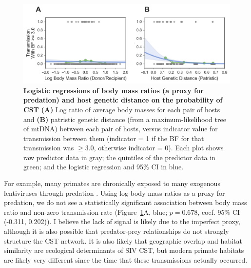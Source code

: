 \begin{figure}[ht!]
  \begin{centering}
    \includegraphics[width=.8\linewidth]{./png/siv_predict.png}
  	\caption[Logistic regressions of predictors on the probability of CST]{\textbf{Logistic regressions of body mass ratios (a proxy for predation) and host genetic distance on the probability of CST }
\textbf{(A)} Log ratio of average body masses for each pair of hosts and \textbf{(B)} patristic genetic distance (from a maximum-likelihood tree of mtDNA) between each pair of hosts, versus indicator value for transmission between them (indicator = 1 if the BF for that transmission was $\geq 3.0$, otherwise indicator = 0).
Each plot shows raw predictor data in gray; the quintiles of the predictor data in green; and the logistic regression and 95\% CI in blue.
    }
  	\label{siv_predict}
  \end{centering}
\end{figure}

For example, many primates are chronically exposed to many exogenous lentiviruses through predation \citep{aghokeng2010extensive,goodall1986chimpanzees,sharp2011origins}.
Using log body mass ratios \citep{iucn2008international} as a proxy for predation, we do not see a statistically significant association between body mass ratio and non-zero transmission rate (Figure~\ref{siv_predict}A, blue; $p=0.678$, coef. 95\% CI (-0.311, 0.202)).
I believe the lack of signal is likely due to the imperfect proxy, although it is also possible that predator-prey relationships do not strongly structure the CST network.
It is also likely that geographic overlap and habitat similarity are ecological determinants of SIV CST, but modern primate habitats are likely very different since the time that these transmissions actually occurred.

